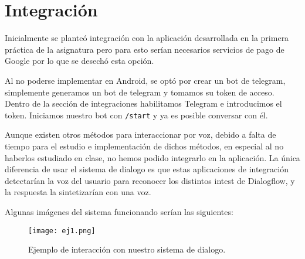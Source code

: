 \section{Integración}

Inicialmente se planteó integración con la aplicación desarrollada en la primera práctica de la asignatura pero para esto serían necesarios servicios de pago de Google por lo que se desechó esta opción.

Al no poderse implementar en Android, se optó por crear un bot de telegram, simplemente generamos un bot de telegram y tomamos su token de acceso. Dentro de la sección de integraciones habilitamos Telegram e introducimos el token. Iniciamos nuestro bot con \texttt{/start} y ya es posible conversar con él.

Aunque existen otros métodos para interaccionar por voz, debido a falta de tiempo para el estudio e implementación de dichos métodos, en especial al no haberlos estudiado en clase, no hemos podido integrarlo en la aplicación. La única diferencia de usar el sistema de dialogo es que estas aplicaciones de integración detectarían la voz del usuario para reconocer los distintos intest de Dialogflow, y la respuesta la sintetizarían con una voz.

Algunas imágenes del sistema funcionando serían las siguientes:

\begin{figure}[H]
  \centering
      \texttt{[image: ej1.png]}
 		\caption{Ejemplo de interacción con nuestro sistema de dialogo.}
\end{figure}



